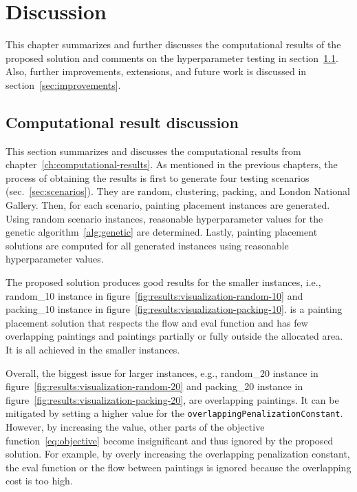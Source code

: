 \chapter{Discussion}\label{ch:discussion}

This chapter summarizes and further discusses the computational results of the proposed solution
and comments on the hyperparameter testing in section~\ref{sec:comp-res-discussion}.
Also, further improvements, extensions, and future work is discussed in section~\ref{sec:improvements}.


\section{Computational result discussion}\label{sec:comp-res-discussion}
This section summarizes and discusses the computational results from chapter~\ref{ch:computational-results}.
As mentioned in the previous chapters, the process of obtaining the results is first to generate four testing scenarios (sec.~\ref{sec:scenarios}).
They are random, clustering, packing, and London National Gallery.
Then, for each scenario, painting placement instances are generated.
Using random scenario instances, reasonable hyperparameter values for the genetic algorithm~\ref{alg:genetic} are determined.
Lastly, painting placement solutions are computed for all generated instances using reasonable hyperparameter values.

The proposed solution produces good results for the smaller instances, i.e., random\_10 instance
in figure~\ref{fig:results:visualization-random-10} and packing\_10 instance in figure~\ref{fig:results:visualization-packing-10}.
 is a painting placement solution that respects the flow and eval function
and has few overlapping paintings and paintings partially or fully outside the allocated area.
It is all achieved in the smaller instances.

Overall, the biggest issue for larger instances, e.g., random\_20 instance in figure~\ref{fig:results:visualization-random-20} and packing\_20 instance in figure~\ref{fig:results:visualization-packing-20}, are overlapping paintings.
It can be mitigated by setting a higher value for the \verb|overlappingPenalizationConstant|.
However, by increasing the value, other parts of the objective function~\ref{eq:objective}
become insignificant and thus ignored by the proposed solution.
For example, by overly increasing the overlapping penalization constant, the eval function
or the flow between paintings is ignored because the overlapping cost is too high.

